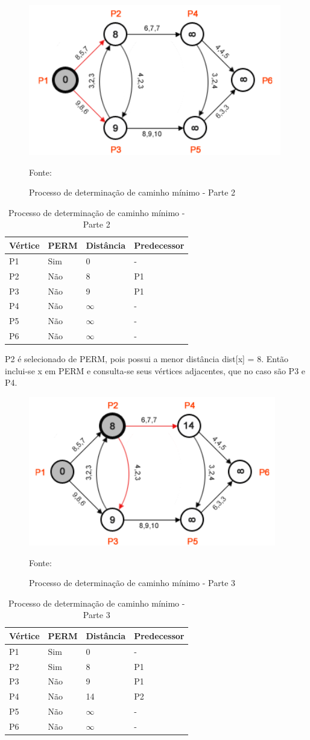 \begin{figure}[htbp]
\centering
 \includegraphics[width=.50\textwidth]{chapters/fig/leo3.png}
\caption{Processo de determinação de caminho mínimo - Parte 2}
Fonte: \cite{leonard}
\label{fig:leo3}
\end{figure}
\FloatBarrier
\begin{table}[htbp]
	\centering
	\begin{tabular}{l l l l}
	\toprule
	Vértice & PERM & Distância & Predecessor\\
	\midrule
	P1 & Sim & 0 & - \\
	P2 & Não & 8 & P1 \\
	P3 & Não & 9 & P1 \\
	P4 & Não & $\infty$ & - \\
	P5 & Não & $\infty$ & - \\
	P6 & Não & $\infty$ & - \\
	\bottomrule
	\end{tabular}
\caption{Processo de determinação de caminho mínimo - Parte 2}
 \label{tab:leotab2}
\end{table}

P2 é selecionado de PERM, pois possui a menor distância dist[x] = 8. Então inclui-se x em PERM e consulta-se
seus vértices adjacentes, que no caso são P3 e P4.

\begin{figure}[htbp]
\centering
 \includegraphics[width=.50\textwidth]{chapters/fig/leo4.png}
\caption{Processo de determinação de caminho mínimo - Parte 3}
Fonte: \cite{leonard}
\label{fig:leo4}
\end{figure}
\FloatBarrier
\begin{table}[htbp]
	\centering
	\begin{tabular}{l l l l}
	\toprule
	Vértice & PERM & Distância & Predecessor\\
	\midrule
	P1 & Sim & 0 & - \\
	P2 & Sim & 8 & P1 \\
	P3 & Não & 9 & P1 \\
	P4 & Não & 14 & P2 \\
	P5 & Não & $\infty$ & - \\
	P6 & Não & $\infty$ & - \\
	\bottomrule
	\end{tabular}
\caption{Processo de determinação de caminho mínimo - Parte 3}
 \label{tab:leotab3}
\end{table}

